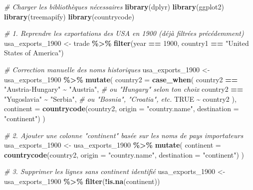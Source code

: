 \documentclass[
]{article}
\newenvironment{Shaded}{\begin{snugshade}}{\end{snugshade}}
\newcommand{\AttributeTok}[1]{\textcolor[rgb]{0.13,0.29,0.53}{#1}}
\newcommand{\CommentTok}[1]{\textcolor[rgb]{0.56,0.35,0.01}{\textit{#1}}}
\newcommand{\ConstantTok}[1]{\textcolor[rgb]{0.56,0.35,0.01}{#1}}
\newcommand{\DecValTok}[1]{\textcolor[rgb]{0.00,0.00,0.81}{#1}}
\newcommand{\FunctionTok}[1]{\textcolor[rgb]{0.13,0.29,0.53}{\textbf{#1}}}
\newcommand{\NormalTok}[1]{#1}
\newcommand{\OtherTok}[1]{\textcolor[rgb]{0.56,0.35,0.01}{#1}}
\newcommand{\SpecialCharTok}[1]{\textcolor[rgb]{0.81,0.36,0.00}{\textbf{#1}}}
\newcommand{\StringTok}[1]{\textcolor[rgb]{0.31,0.60,0.02}{#1}}
\begin{document}
\begin{Shaded}
\begin{Highlighting}[]
\CommentTok{\# Charger les bibliothèques nécessaires}
\FunctionTok{library}\NormalTok{(dplyr)}
\FunctionTok{library}\NormalTok{(ggplot2)}
\FunctionTok{library}\NormalTok{(treemapify)}
\FunctionTok{library}\NormalTok{(countrycode)}

\CommentTok{\# 1. Reprendre les exportations des USA en 1900 (déjà filtrées précédemment)}
\NormalTok{usa\_exports\_1900 }\OtherTok{\textless{}{-}}\NormalTok{ trade }\SpecialCharTok{\%\textgreater{}\%} \FunctionTok{filter}\NormalTok{(year }\SpecialCharTok{==} \DecValTok{1900}\NormalTok{, country1 }\SpecialCharTok{==} \StringTok{"United States of America"}\NormalTok{)}

\CommentTok{\# Correction manuelle des noms historiques}
\NormalTok{usa\_exports\_1900 }\OtherTok{\textless{}{-}}\NormalTok{ usa\_exports\_1900 }\SpecialCharTok{\%\textgreater{}\%}
  \FunctionTok{mutate}\NormalTok{(}
    \AttributeTok{country2 =} \FunctionTok{case\_when}\NormalTok{(}
\NormalTok{      country2 }\SpecialCharTok{==} \StringTok{"Austria{-}Hungary"} \SpecialCharTok{\textasciitilde{}} \StringTok{"Austria"}\NormalTok{,       }\CommentTok{\# ou "Hungary" selon ton choix}
\NormalTok{      country2 }\SpecialCharTok{==} \StringTok{"Yugoslavia"} \SpecialCharTok{\textasciitilde{}} \StringTok{"Serbia"}\NormalTok{,             }\CommentTok{\# ou "Bosnia", "Croatia", etc.}
      \ConstantTok{TRUE} \SpecialCharTok{\textasciitilde{}}\NormalTok{ country2}
\NormalTok{    ),}
    \AttributeTok{continent =} \FunctionTok{countrycode}\NormalTok{(country2, }\AttributeTok{origin =} \StringTok{"country.name"}\NormalTok{, }\AttributeTok{destination =} \StringTok{"continent"}\NormalTok{)}
\NormalTok{  )}


\CommentTok{\# 2. Ajouter une colonne "continent" basée sur les noms de pays importateurs}
\NormalTok{usa\_exports\_1900 }\OtherTok{\textless{}{-}}\NormalTok{ usa\_exports\_1900 }\SpecialCharTok{\%\textgreater{}\%}
  \FunctionTok{mutate}\NormalTok{(}
    \AttributeTok{continent =} \FunctionTok{countrycode}\NormalTok{(country2, }\AttributeTok{origin =} \StringTok{"country.name"}\NormalTok{, }\AttributeTok{destination =} \StringTok{"continent"}\NormalTok{)}
\NormalTok{  )}

\CommentTok{\# 3. Supprimer les lignes sans continent identifié}
\NormalTok{usa\_exports\_1900 }\OtherTok{\textless{}{-}}\NormalTok{ usa\_exports\_1900 }\SpecialCharTok{\%\textgreater{}\%} \FunctionTok{filter}\NormalTok{(}\SpecialCharTok{!}\FunctionTok{is.na}\NormalTok{(continent))}


\end{Highlighting}
\end{Shaded}
\end{document}
